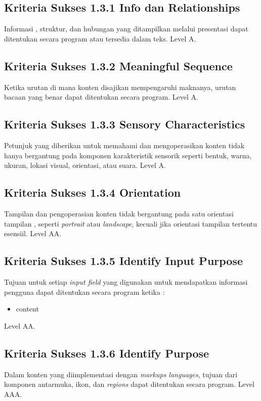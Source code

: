 \subsection{Kriteria Sukses 1.3.1 Info dan Relationships}
\label{sec:kriteria_1.3.1}
Informasi , struktur, dan hubungan yang ditampilkan melalui presentasi dapat ditentukan secara program atau tersedia dalam teks.
Level A.

\subsection{Kriteria Sukses 1.3.2 Meaningful Sequence}
\label{sec:kriteria_1.3.2}
Ketika urutan di mana konten disajikan mempengaruhi maknanya, urutan bacaan yang benar dapat ditentukan secara program.
Level A.

\subsection{Kriteria Sukses 1.3.3 Sensory Characteristics}
\label{sec:kriteria_1.3.3}
Petunjuk yang diberikan untuk memahami dan mengoperasikan konten tidak hanya bergantung pada komponen karakteristik sensorik seperti bentuk, warna, ukuran, lokasi visual, orientasi, atau suara.
Level A.

\subsection{Kriteria Sukses 1.3.4 Orientation}
\label{sec:kriteria_1.3.4}
Tampilan dan pengoperasian konten tidak bergantung pada satu orientasi tampilan , seperti \textit{portrait} atau \textit{landscape}, kecuali jika orientasi tampilan tertentu esensiil.
Level AA.

\subsection{Kriteria Sukses 1.3.5 Identify Input Purpose}
\label{sec:kriteria_1.3.5}
Tujuan untuk setiap \textit{input field} yang digunakan untuk mendapatkan informasi pengguna dapat ditentukan secara program ketika :
\begin{itemize}
	\item content
\end{itemize}
Level AA.

\subsection{Kriteria Sukses 1.3.6 Identify Purpose}
\label{sec:kriteria_1.3.6}
Dalam konten yang diimplementasi dengan \textit{markups languages}, tujuan dari komponen antarmuka, ikon, dan \textit{regions} dapat ditentukan secara program.
Level AAA.

